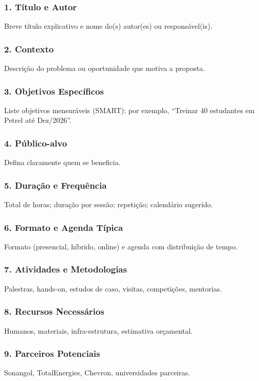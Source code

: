 \documentclass[12pt,a4paper]{article}
\begin{document}
\subsubsection*{1. Título e Autor}
Breve título explicativo e nome do(s) autor(es) ou responsável(is).

\subsubsection*{2. Contexto}
Descrição do problema ou oportunidade que motiva a proposta.

\subsubsection*{3. Objetivos Específicos}
Liste objetivos mensuráveis (SMART): por exemplo, ``Treinar 40 estudantes em Petrel até Dez/2026''.

\subsubsection*{4. Público-alvo}
Defina claramente quem se beneficia.

\subsubsection*{5. Duração e Frequência}
Total de horas; duração por sessão; repetição; calendário sugerido.

\subsubsection*{6. Formato e Agenda Típica}
Formato (presencial, híbrido, online) e agenda com distribuição de tempo.

\subsubsection*{7. Atividades e Metodologias}
Palestras, hands-on, estudos de caso, visitas, competições, mentorias.

\subsubsection*{8. Recursos Necessários}
Humanos, materiais, infra-estrutura, estimativa orçamental.

\subsubsection*{9. Parceiros Potenciais}
Sonangol, TotalEnergies, Chevron, universidades parceiras.
\end{document}
